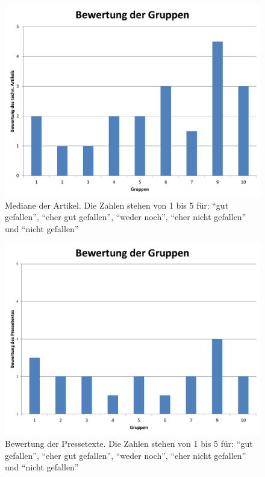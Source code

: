 \begin{figure}[h!tbp]
    \begin{center}
        \includegraphics[width=\textwidth]{images/bewertungen-artikel}
    \end{center}
    \caption{Mediane der Artikel. Die Zahlen 
    stehen von 1 bis 5 für: \enquote{gut gefallen}, \enquote{eher gut 
    gefallen}, \enquote{weder noch}, \enquote{eher nicht gefallen} und 
    \enquote{nicht gefallen}}
    \label{fig:mediane}
\end{figure}

\begin{figure}[h!tbp]
    \begin{center}
        \includegraphics[width=\textwidth]{images/bewertungen}
    \end{center}
    \caption{Bewertung der Pressetexte. Die Zahlen 
    stehen von 1 bis 5 für: \enquote{gut gefallen}, \enquote{eher gut 
    gefallen}, \enquote{weder noch}, \enquote{eher nicht gefallen} und 
    \enquote{nicht gefallen}}
    \label{fig:bewertungen}
\end{figure}

